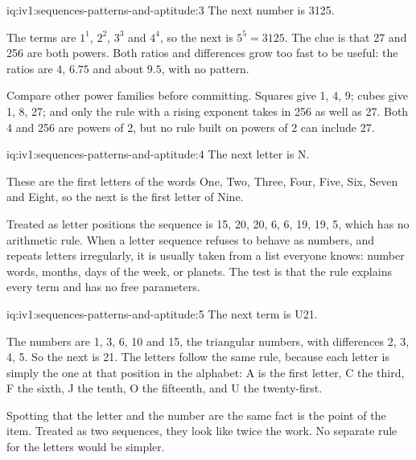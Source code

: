 \begin{solution}{iq:iv1:sequences-patterns-and-aptitude:3}
The next number is 3125.

The terms are $1^1$, $2^2$, $3^3$ and $4^4$, so the next is $5^5 = 3125$. The clue is that 27 and 256 are both powers. Both ratios and differences grow too fast to be useful: the ratios are 4, $6.75$ and about $9.5$, with no pattern.

Compare other power families before committing. Squares give 1, 4, 9; cubes give 1, 8, 27; and only the rule with a rising exponent takes in 256 as well as 27. Both 4 and 256 are powers of 2, but no rule built on powers of 2 can include 27.

\end{solution}

\begin{solution}{iq:iv1:sequences-patterns-and-aptitude:4}
The next letter is N.

These are the first letters of the words One, Two, Three, Four, Five, Six, Seven and Eight, so the next is the first letter of Nine.

Treated as letter positions the sequence is 15, 20, 20, 6, 6, 19, 19, 5, which has no arithmetic rule. When a letter sequence refuses to behave as numbers, and repeats letters irregularly, it is usually taken from a list everyone knows: number words, months, days of the week, or planets. The test is that the rule explains every term and has no free parameters.

\end{solution}

\begin{solution}{iq:iv1:sequences-patterns-and-aptitude:5}
The next term is U21.

The numbers are 1, 3, 6, 10 and 15, the triangular numbers, with differences 2, 3, 4, 5. So the next is 21. The letters follow the same rule, because each letter is simply the one at that position in the alphabet: A is the first letter, C the third, F the sixth, J the tenth, O the fifteenth, and U the twenty-first.

Spotting that the letter and the number are the same fact is the point of the item. Treated as two sequences, they look like twice the work. No separate rule for the letters would be simpler.

\end{solution}


